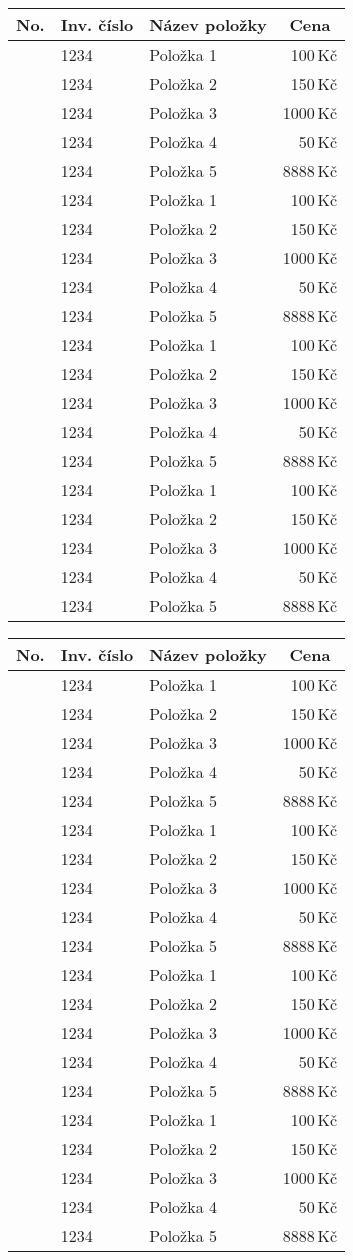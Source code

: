 \documentclass{article}
\newcounter{polozkacnt}
\def\zahlavi{
\begin{tabular}{|r|l|l|r<{\,Kč}|}
\hline
\multicolumn{1}{|c|}{\textbf{No.}} & \textbf{Inv. číslo} & \textbf{Název položky} & \multicolumn{1}{c|}{\textbf{Cena}}\\
\hline}
\def\polozka#1#2#3{
\stepcounter{polozkacnt}
\thepolozkacnt & #1 & #2 & #3\\}
\def\konecstrany{
\hline
\end{tabular}
}
\begin{document}
\pagestyle{fancy}
\fancyfoot{}

\zahlavi
\polozka{1234}{Položka 1}{100}
\polozka{1234}{Položka 2}{150}
\polozka{1234}{Položka 3}{1000}
\polozka{1234}{Položka 4}{50}
\polozka{1234}{Položka 5}{8888}
\hline
\polozka{1234}{Položka 1}{100}
\polozka{1234}{Položka 2}{150}
\polozka{1234}{Položka 3}{1000}
\polozka{1234}{Položka 4}{50}
\polozka{1234}{Položka 5}{8888}
\hline
\polozka{1234}{Položka 1}{100}
\polozka{1234}{Položka 2}{150}
\polozka{1234}{Položka 3}{1000}
\polozka{1234}{Položka 4}{50}
\polozka{1234}{Položka 5}{8888}
\hline
\polozka{1234}{Položka 1}{100}
\polozka{1234}{Položka 2}{150}
\polozka{1234}{Položka 3}{1000}
\polozka{1234}{Položka 4}{50}
\polozka{1234}{Položka 5}{8888}
\konecstrany
\clearpage

\zahlavi
\polozka{1234}{Položka 1}{100}
\polozka{1234}{Položka 2}{150}
\polozka{1234}{Položka 3}{1000}
\polozka{1234}{Položka 4}{50}
\polozka{1234}{Položka 5}{8888}
\hline
\polozka{1234}{Položka 1}{100}
\polozka{1234}{Položka 2}{150}
\polozka{1234}{Položka 3}{1000}
\polozka{1234}{Položka 4}{50}
\polozka{1234}{Položka 5}{8888}
\hline
\polozka{1234}{Položka 1}{100}
\polozka{1234}{Položka 2}{150}
\polozka{1234}{Položka 3}{1000}
\polozka{1234}{Položka 4}{50}
\polozka{1234}{Položka 5}{8888}
\hline
\polozka{1234}{Položka 1}{100}
\polozka{1234}{Položka 2}{150}
\polozka{1234}{Položka 3}{1000}
\polozka{1234}{Položka 4}{50}
\polozka{1234}{Položka 5}{8888}
\konecstrany
\end{document}
